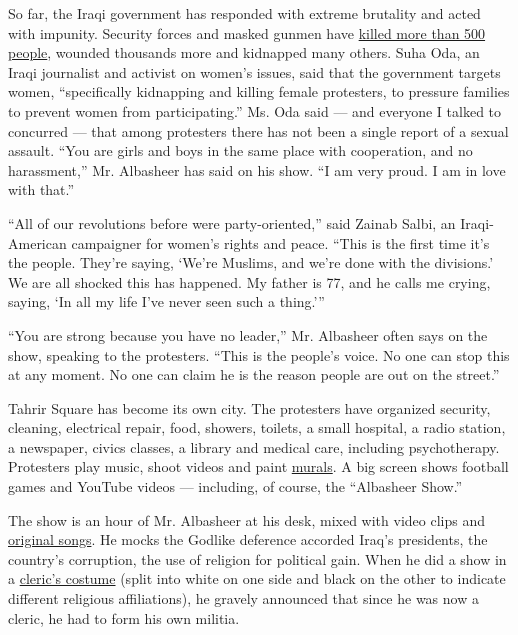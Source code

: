 So far, the Iraqi government has responded with extreme brutality and
acted with impunity. Security forces and masked gunmen have
\href{https://www.nytimes3xbfgragh.onion/2019/12/21/world/middleeast/Iraq-protests-Iran.html}{killed
more than 500 people}, wounded thousands more and kidnapped many others.
Suha Oda, an Iraqi journalist and activist on women's issues, said that
the government targets women, ``specifically kidnapping and killing
female protesters, to pressure families to prevent women from
participating.'' Ms. Oda said --- and everyone I talked to concurred ---
that among protesters there has not been a single report of a sexual
assault. ``You are girls and boys in the same place with cooperation,
and no harassment,'' Mr. Albasheer has said on his show. ``I am very
proud. I am in love with that.''

``All of our revolutions before were party-oriented,'' said Zainab
Salbi, an Iraqi-American campaigner for women's rights and peace. ``This
is the first time it's the people. They're saying, `We're Muslims, and
we're done with the divisions.' We are all shocked this has happened. My
father is 77, and he calls me crying, saying, `In all my life I've never
seen such a thing.'''

``You are strong because you have no leader,'' Mr. Albasheer often says
on the show, speaking to the protesters. ``This is the people's voice.
No one can stop this at any moment. No one can claim he is the reason
people are out on the street.''

Tahrir Square has become its own city. The protesters have organized
security, cleaning, electrical repair, food, showers, toilets, a small
hospital, a radio station, a newspaper, civics classes, a library and
medical care, including psychotherapy. Protesters play music, shoot
videos and paint
\href{https://www.theguardian.com/global-development/gallery/2019/nov/26/murals-of-baghdad-the-protest-art-in-pictures}{murals}.
A big screen shows football games and YouTube videos --- including, of
course, the ``Albasheer Show.''

The show is an hour of Mr. Albasheer at his desk, mixed with video clips
and
\href{https://www.youtube.com/watch?v=uXgT-hvf_1o\&feature=youtu.be}{original
songs}. He mocks the Godlike deference accorded Iraq's presidents, the
country's corruption, the use of religion for political gain. When he
did a show in a
\href{https://www.youtube.com/watch?v=RQ54rlGp4WM\&feature=youtu.be}{cleric's
costume} (split into white on one side and black on the other to
indicate different religious affiliations), he gravely announced that
since he was now a cleric, he had to form his own militia.

